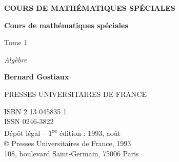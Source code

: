 \thispagestyle{empty}
\vspace*{1.1in}
\begin{center}
{\sffamily\small\bfseries\color{BellaLavenderDeep} COURS DE MATHÉMATIQUES SPÉCIALES}\par
\vspace{1.15in}
{\fontsize{30}{34}\selectfont\bfseries Cours de mathématiques spéciales}\par
\vspace{0.35in}
{\Large Tome 1}\par
\vspace{0.12in}
{\Huge\itshape\color{BellaLavenderDeep} Algèbre}\par
\vfill
{\Large\bfseries Bernard Gostiaux}\par
\vspace{0.9in}
{\sffamily\small PRESSES UNIVERSITAIRES DE FRANCE}\par
\end{center}
\clearpage
\thispagestyle{empty}
\vspace*{\fill}
{\small\sffamily\color{BellaGray}
ISBN 2 13 045835 1\\
ISSN 0246-3822\\
Dépôt légal -- 1\textsuperscript{re} édition : 1993, août\\
© Presses Universitaires de France, 1993\\
108, boulevard Saint-Germain, 75006 Paris
}\par
\vspace{0.55in}
\clearpage
